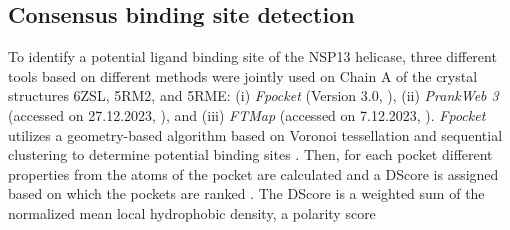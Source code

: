 \documentclass[11pt, letterpaper, titlepage]{article}
\renewcommand{\cite}{\parencite}
\begin{document}
\subsection{Consensus binding site detection}
To identify a potential ligand binding site of the NSP13 helicase, three different tools based on different methods were jointly used on Chain A of the crystal structures 6ZSL, 5RM2, and 5RME: (i) \textit{Fpocket} (Version 3.0, \textcite{package_Fpocket}), (ii) \textit{PrankWeb 3} (accessed on 27.12.2023, \textcite{package_P2Rank, package_PrankWeb, package_PrankWeb3}), and (iii) \textit{FTMap} (accessed on 7.12.2023, \textcite{package_FTMAP}).  
\textit{Fpocket} utilizes a geometry-based algorithm based on Voronoi tessellation and sequential clustering to determine potential binding sites \cite{package_Fpocket}. Then, for each pocket different properties from the atoms of the pocket are calculated and a \ac{DScore} is assigned based on which the pockets are ranked \cite{package_Fpocket}. 
The \ac{DScore} is a weighted sum of the normalized mean local hydrophobic density, a polarity score %
\end{document}
